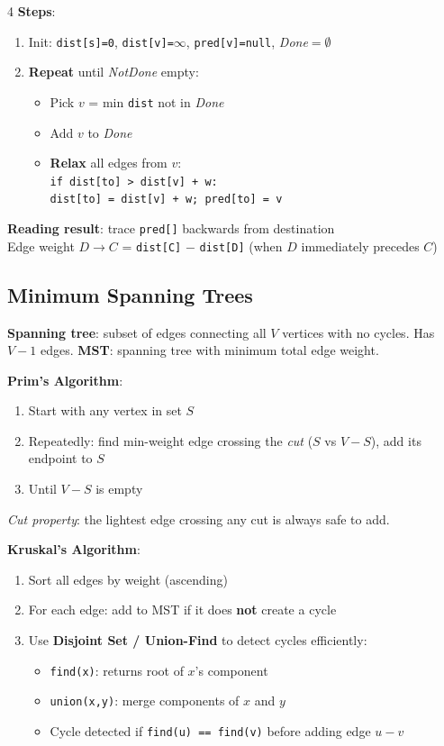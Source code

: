 \documentclass[7pt,landscape]{article}
\begin{document}
\begin{multicols}{4}
\textbf{Steps}:
\begin{enumerate}
  \item Init: \texttt{dist[s]=0}, \texttt{dist[v]=$\infty$}, \texttt{pred[v]=null}, \textit{Done}$=\emptyset$
  \item \textbf{Repeat} until \textit{NotDone} empty:
  \begin{itemize}
    \item Pick $v$ = min \texttt{dist} not in \textit{Done}
    \item Add $v$ to \textit{Done}
    \item \textbf{Relax} all edges from $v$:\\
    \texttt{if dist[to] > dist[v] + w:}\\
    \quad\texttt{dist[to] = dist[v] + w; pred[to] = v}
  \end{itemize}
\end{enumerate}
\textbf{Reading result}: trace \texttt{pred[]} backwards from destination\\
Edge weight $D\!\to\!C$ = \texttt{dist[C]} $-$ \texttt{dist[D]} (when $D$ immediately precedes $C$)

\subsection{Minimum Spanning Trees}
\textbf{Spanning tree}: subset of edges connecting all $V$ vertices with no cycles. Has $V{-}1$ edges. \textbf{MST}: spanning tree with minimum total edge weight.

\textbf{Prim's Algorithm}:
\begin{enumerate}
  \item Start with any vertex in set $S$
  \item Repeatedly: find min-weight edge crossing the \textit{cut} ($S$ vs $V{-}S$), add its endpoint to $S$
  \item Until $V{-}S$ is empty
\end{enumerate}
\textit{Cut property}: the lightest edge crossing any cut is always safe to add.

\textbf{Kruskal's Algorithm}:
\begin{enumerate}
  \item Sort all edges by weight (ascending)
  \item For each edge: add to MST if it does \textbf{not} create a cycle
  \item Use \textbf{Disjoint Set / Union-Find} to detect cycles efficiently:
  \begin{itemize}
    \item \texttt{find(x)}: returns root of $x$'s component
    \item \texttt{union(x,y)}: merge components of $x$ and $y$
    \item Cycle detected if \texttt{find(u) == find(v)} before adding edge $u{-}v$
  \end{itemize}
\end{enumerate}


\end{multicols}
\end{document}

